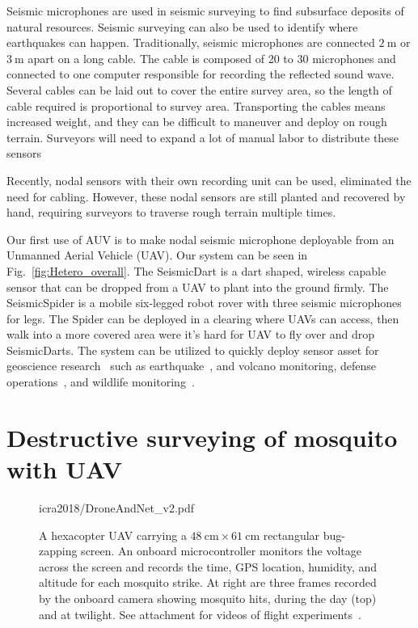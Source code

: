 Seismic microphones are used in seismic surveying to find subsurface deposits of natural resources.
Seismic surveying can also be used to identify where earthquakes can happen.
Traditionally, seismic microphones are connected $\SI{2}{\metre}$ or $\SI{3}{\metre}$ apart on a long cable.
The cable is composed of 20 to 30 microphones and connected to one computer responsible for recording the reflected sound wave.
Several cables can be laid out to cover the entire survey area, so the length of cable required is proportional to survey area.
Transporting the cables means increased weight, and they can be difficult to maneuver and deploy on rough terrain.
Surveyors will need to expand a lot of manual labor to distribute these sensors

Recently, nodal sensors with their own recording unit can be used, eliminated the need for cabling.
However, these nodal sensors are still planted and recovered by hand, requiring surveyors to traverse rough terrain multiple times.

Our first use of AUV is to make nodal seismic microphone deployable from an Unmanned Aerial Vehicle (UAV).
Our system can be seen in Fig.~\ref{fig:Hetero_overall}.
The SeismicDart is a dart shaped, wireless capable sensor that can be dropped from a UAV to plant into the ground firmly.
The SeismicSpider is a mobile six-legged robot rover with three seismic microphones for legs.
The Spider can be deployed in a clearing where UAVs can access, then walk into a more covered area were it's hard for UAV to fly over and drop SeismicDarts.
The system can be utilized to quickly deploy sensor asset for geoscience research~\cite{werner2006deploying} such as
earthquake~\cite{dominici2012micro},
and volcano \cite{nagatani2013volcanic} monitoring,
defense operations~\cite{wu2007efficient},
and wildlife monitoring~\cite{dyo2010evolution,mainwaring2002wireless}. 

\section[Mosquito AUV]{Destructive surveying of mosquito with UAV}

\begin{figure}
	\centering
	\begin{overpic}[width=1\columnwidth]{icra2018/DroneAndNet_v2.pdf}\end{overpic}
	\caption{\label{fig:DroneAndNet}
		A hexacopter UAV carrying a $\SI{48}{\centi\metre} \times \SI{61}{\centi\metre}$ rectangular bug-zapping screen.
		An onboard microcontroller monitors the voltage across the screen and records the time, GPS location, humidity, and altitude for each mosquito strike.
		At right are three frames recorded by the onboard camera showing mosquito hits, during the day (top) and at twilight.
		See attachment for videos of flight experiments~\cite{Bhatnagar2018}.
	}
\end{figure}

